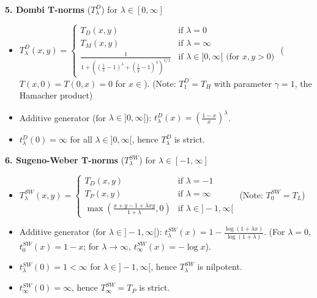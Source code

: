 \begin{example}
\textbf{5. Dombi T-norms} ($T_\lambda^D$) for $\lambda \in [0, \infty]$ 
\begin{itemize}
    \item $T_\lambda^D(x,y) = \begin{cases} T_D(x,y) & \text{if } \lambda = 0 \\ T_M(x,y) & \text{if } \lambda = \infty \\ \frac{1}{1 + \left(\left(\frac{1}{x}-1\right)^\lambda + \left(\frac{1}{y}-1\right)^\lambda\right)^{1/\lambda}} & \text{if } \lambda \in ]0, \infty[ \text{ (for } x,y > 0) \end{cases}$
    ($T(x,0)=T(0,x)=0$ for $x \in$). (Note: $T_1^D = T_H$ with parameter $\gamma=1$, the Hamacher product)
    \item Additive generator (for $\lambda \in ]0, \infty[$): $t_\lambda^D(x) = \left(\frac{1-x}{x}\right)^\lambda$.
    \item $t_\lambda^D(0) = \infty$ for all $\lambda \in ]0, \infty[$, hence $T_\lambda^D$ is strict.
\end{itemize}

\textbf{6. Sugeno-Weber T-norms} ($T_\lambda^{SW}$) for $\lambda \in [-1, \infty]$
\begin{itemize}
    \item $T_\lambda^{SW}(x,y) = \begin{cases} T_D(x,y) & \text{if } \lambda = -1 \\ T_P(x,y) & \text{if } \lambda = \infty \\ \max\left(\frac{x+y-1+\lambda xy}{1+\lambda}, 0\right) & \text{if } \lambda \in ]-1, \infty[ \end{cases}$
    (Note: $T_0^{SW} = T_L$)
    \item Additive generator (for $\lambda \in ]-1, \infty[$): $t_\lambda^{SW}(x) = 1 - \frac{\log(1+\lambda x)}{\log(1+\lambda)}$. (For $\lambda=0$, $t_0^{SW}(x)=1-x$; for $\lambda \to \infty$, $t_\infty^{SW}(x)=-\log x$).
    \item $t_\lambda^{SW}(0) = 1 < \infty$ for $\lambda \in ]-1, \infty[$, hence $T_\lambda^{SW}$ is nilpotent.
    \item $t_\infty^{SW}(0) = \infty$, hence $T_\infty^{SW} = T_P$ is strict.
\end{itemize}


\end{example}
